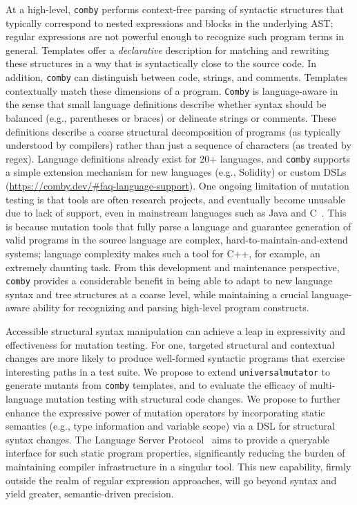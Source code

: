 At a high-level, {\tt comby} performs
context-free
parsing of syntactic structures that typically correspond to nested
expressions and blocks in the underlying AST; regular expressions are not powerful enough to recognize such program terms in general. Templates offer a \emph{declarative} description for matching and rewriting these structures in a way that is syntactically close to the source code.
In addition, {\tt comby} can distinguish between code, strings, and comments. Templates contextually match these dimensions of a program. %
{\tt Comby} is language-aware in the sense that small language
definitions describe whether syntax should be balanced (e.g.,
parentheses or braces) or delineate strings or comments. These
definitions describe a coarse structural decomposition of programs (as
typically understood by compilers) rather than just a sequence of
characters (as treated by regex). Language definitions already exist
for 20+ languages, and {\tt comby} supports a simple extension
mechanism for new languages (e.g., Solidity) or custom DSLs (\url{https://comby.dev/\#faq-language-support}).
One ongoing limitation of mutation testing is that tools are often research
projects, and eventually become unusable due to lack of support, even in
mainstream languages such as Java and C~\cite{MutChoice}.
This is because mutation tools that fully parse a language and guarantee generation of
valid programs in the source language are complex, hard-to-maintain-and-extend
systems; language complexity makes such a tool for C++, for example, an extremely daunting task. From this development and maintenance perspective, {\tt comby} provides a considerable benefit in being able to adapt to new language syntax and tree structures at a coarse level, while maintaining a crucial language-aware ability for recognizing and parsing high-level program constructs.

Accessible structural syntax manipulation can achieve a leap in
expressivity and effectiveness for mutation testing. %
For one, targeted structural and contextual changes are
more likely to produce well-formed syntactic programs
that exercise interesting paths in a test suite.
We propose to extend {\tt universalmutator}
to generate mutants from {\tt comby} templates, and to evaluate the efficacy of
multi-language mutation testing with structural code changes.  We propose to further enhance the expressive power of mutation operators by
incorporating static semantics (e.g., type information and variable scope) via a
DSL for structural syntax changes. The Language Server Protocol~\cite{lsp-web} aims to
provide a queryable interface for such static program properties, significantly
reducing the burden of maintaining compiler infrastructure in a singular tool.
This new capability, firmly outside the realm of regular
expression approaches, will go beyond syntax and yield greater, semantic-driven precision.

